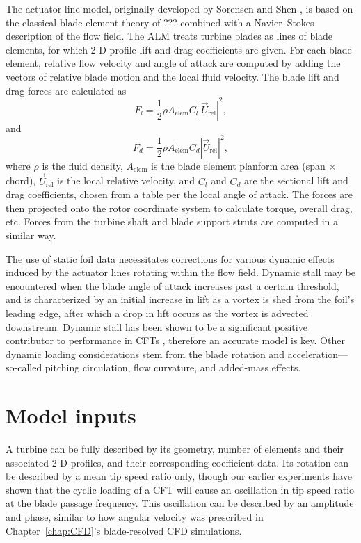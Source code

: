 The actuator line model, originally developed by Sorensen and Shen
\cite{Sorensen2002}, is based on the classical blade element theory of ???
combined with a Navier--Stokes description of the flow field.
The ALM treats turbine blades as lines of blade elements, for which
2-D profile lift and drag coefficients are given. For each blade element,
relative flow velocity and angle of attack are computed by adding the vectors
of relative blade motion and the local fluid velocity. The blade lift and drag
forces are calculated as
\begin{equation}
    F_l = \frac{1}{2} \rho A_\mathrm{elem} C_l |\vec{U}_\mathrm{rel}|^2,
\end{equation}
and
\begin{equation}
    F_d = \frac{1}{2} \rho A_\mathrm{elem} C_d |\vec{U}_\mathrm{rel}|^2,
\end{equation}
where $\rho$ is the fluid density, $A_\mathrm{elem}$ is the blade element
planform area (span $\times$ chord), $\vec{U}_\mathrm{rel}$ is the local
relative velocity, and $C_l$ and $C_d$ are the sectional lift and drag
coefficients, chosen from a table per the local angle of attack. The forces are
then projected onto the rotor coordinate system to calculate torque, overall
drag, etc. Forces from the turbine shaft and blade support struts are computed
in a similar way.

The use of static foil data necessitates corrections for various dynamic effects
induced by the actuator lines rotating within the flow field. Dynamic stall may
be encountered when the blade angle of attack increases past a certain
threshold, and is characterized by an initial increase in lift as a vortex is
shed from the foil's leading edge, after which a drop in lift occurs as the
vortex is advected downstream. Dynamic stall has been shown to be a significant
positive contributor to performance in CFTs \cite{Para2002, Urbina2013},
therefore an accurate model is key. Other dynamic loading considerations stem
from the blade rotation and acceleration---so-called pitching circulation, flow
curvature, and added-mass effects.


\section{Model inputs}

A turbine can be fully described by its geometry, number of elements and their
associated 2-D profiles, and their corresponding coefficient data. Its rotation
can be described by a mean tip speed ratio only, though our earlier experiments
have shown that the cyclic loading of a CFT will cause an oscillation in tip
speed ratio at the blade passage frequency. This oscillation can be described by
an amplitude and phase, similar to how angular velocity was prescribed in
Chapter~\ref{chap:CFD}'s blade-resolved CFD simulations.


